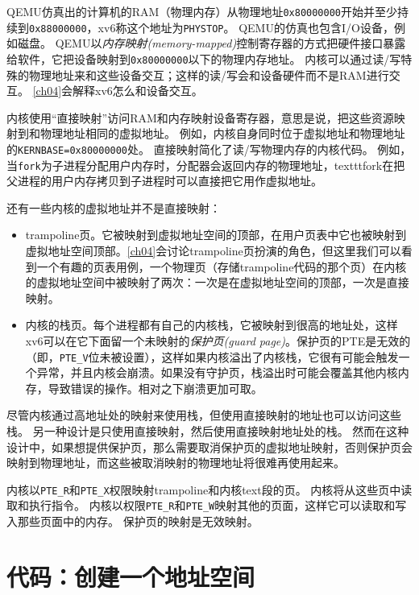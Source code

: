 QEMU仿真出的计算机的RAM（物理内存）从物理地址\texttt{0x80000000}开始并至少持续到\texttt{0x88000000}，xv6称这个地址为\texttt{PHYSTOP}。
QEMU的仿真也包含I/O设备，例如磁盘。
QEMU以\emph{内存映射(memory-mapped)}控制寄存器的方式把硬件接口暴露给软件，它把设备映射到\texttt{0x80000000}以下的物理内存地址。
内核可以通过读/写特殊的物理地址来和这些设备交互；这样的读/写会和设备硬件而不是RAM进行交互。
\autoref{ch04}会解释xv6怎么和设备交互。

内核使用“直接映射”访问RAM和内存映射设备寄存器，意思是说，把这些资源映射到和物理地址相同的虚拟地址。
例如，内核自身同时位于虚拟地址和物理地址的\texttt{KERNBASE=0x80000000}处。
直接映射简化了读/写物理内存的内核代码。
例如，当\texttt{fork}为子进程分配用户内存时，分配器会返回内存的物理地址，texttt{fork}在把父进程的用户内存拷贝到子进程时可以直接把它用作虚拟地址。

还有一些内核的虚拟地址并不是直接映射：
\begin{itemize}
    \item trampoline页。它被映射到虚拟地址空间的顶部，在用户页表中它也被映射到虚拟地址空间顶部。\autoref{ch04}会讨论trampoline页扮演的角色，但这里我们可以看到一个有趣的页表用例，一个物理页（存储trampoline代码的那个页）在内核的虚拟地址空间中被映射了两次：一次是在虚拟地址空间的顶部，一次是直接映射。
    \item 内核的栈页。每个进程都有自己的内核栈，它被映射到很高的地址处，这样xv6可以在它下面留一个未映射的\emph{保护页(guard page)}。保护页的PTE是无效的（即，\texttt{PTE\_V}位未被设置），这样如果内核溢出了内核栈，它很有可能会触发一个异常，并且内核会崩溃。如果没有守护页，栈溢出时可能会覆盖其他内核内存，导致错误的操作。相对之下崩溃更加可取。
\end{itemize}

尽管内核通过高地址处的映射来使用栈，但使用直接映射的地址也可以访问这些栈。
另一种设计是只使用直接映射，然后使用直接映射地址处的栈。
然而在这种设计中，如果想提供保护页，那么需要取消保护页的虚拟地址映射，否则保护页会映射到物理地址，而这些被取消映射的物理地址将很难再使用起来。

内核以\texttt{PTE\_R}和\texttt{PTE\_X}权限映射trampoline和内核text段的页。
内核将从这些页中读取和执行指令。
内核以权限\texttt{PTE\_R}和\texttt{PTE\_W}映射其他的页面，这样它可以读取和写入那些页面中的内存。
保护页的映射是无效映射。

\section{代码：创建一个地址空间}

